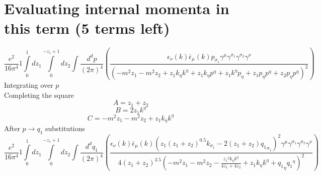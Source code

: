 \section*{Evaluating internal momenta in this term (5 terms left)}
\begin{dmath}\frac{e^{2}}{16 \pi^{4}}1\int\limits_{ 0 }^{ 1 } d{ z_{ 1 } }\int\limits_{ 0 }^{ - { z_{ 1 } } + 1 } d{ z_{ 2 } }\int\frac{d^d p }{ (2\pi)^4 }\left(\frac{\epsilon_{ \nu }({ k }) \bar{\epsilon}_{ \mu }({ k }) { { p }_{ \sigma_1 } } { \gamma^{ \mu } } { \gamma^{ \sigma_1 } } { \gamma^{ \sigma_2 } } { \gamma^{ \nu } }}{\left(- m^{2} { z_{ 1 } } - m^{2} { z_{ 2 } } + { z_{ 1 } } { { k }_{ \eta } } { { k }^{ \eta } } + { z_{ 1 } } { { k }_{ \eta } } { { p }^{ \eta } } + { z_{ 1 } } { { k }^{ \eta } } { { p }_{ \eta } } + { z_{ 1 } } { { p }_{ \eta } } { { p }^{ \eta } } + { z_{ 2 } } { { p }_{ \eta } } { { p }^{ \eta } }\right)^{2}}\right)\end{dmath}
Integrating over $p$\\
Completing the square\
\begin{dmath}A = { z_{ 1 } } + { z_{ 2 } }\end{dmath}
\begin{dmath}B = 2 { z_{ 1 } } { { k }^{ \eta } }\end{dmath}
\begin{dmath}C = - m^{2} { z_{ 1 } } - m^{2} { z_{ 2 } } + { z_{ 1 } } { { k }_{ \eta } } { { k }^{ \eta } }\end{dmath}
After $p \to q_1$ substitutions
\begin{dmath}\frac{e^{2}}{16 \pi^{4}}1\int\limits_{ 0 }^{ 1 } d{ z_{ 1 } }\int\limits_{ 0 }^{ - { z_{ 1 } } + 1 } d{ z_{ 2 } }\int\frac{d^d q_1 }{ (2\pi)^4 }\left(\frac{\epsilon_{ \nu }({ k }) \bar{\epsilon}_{ \mu }({ k }) \left({ z_{ 1 } } \left({ z_{ 1 } } + { z_{ 2 } }\right)^{0.5} { { k }_{ \sigma_1 } } - 2 \left({ z_{ 1 } } + { z_{ 2 } }\right) { { q_1 }_{ \sigma_1 } }\right)^{2} { \gamma^{ \mu } } { \gamma^{ \sigma_1 } } { \gamma^{ \sigma_2 } } { \gamma^{ \nu } }}{4 \left({ z_{ 1 } } + { z_{ 2 } }\right)^{3.5} \left(- m^{2} { z_{ 1 } } - m^{2} { z_{ 2 } } - \frac{{ z_{ 1 } }^{2} { { k }_{ \eta } } { { k }^{ \eta } }}{4 { z_{ 1 } } + 4 { z_{ 2 } }} + { z_{ 1 } } { { k }_{ \eta } } { { k }^{ \eta } } + { { q_1 }_{ \eta } } { { q_1 }^{ \eta } }\right)^{2}}\right)\end{dmath}
